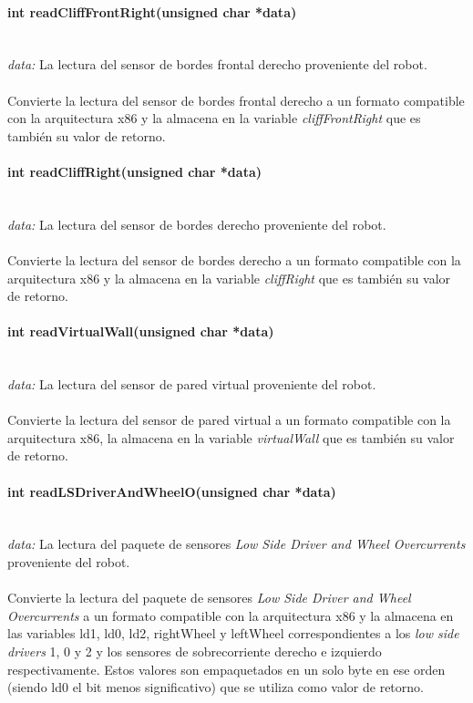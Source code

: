\documentclass[letterpaper,openright,12pt]{book}
\begin{document}
\paragraph{int readCliffFrontRight(unsigned char *data)}\mbox{}\\
\emph{data: }La lectura del sensor de bordes frontal derecho proveniente del robot.\\\\
Convierte la lectura del sensor de bordes frontal derecho a un formato compatible con la arquitectura x86 y la almacena en la variable \emph{cliffFrontRight} que es también su valor de retorno.\\ 

\paragraph{int readCliffRight(unsigned char *data)}\mbox{}\\
\emph{data: }La lectura del sensor de bordes derecho proveniente del robot.\\\\
Convierte la lectura del sensor de bordes derecho a un formato compatible con la arquitectura x86 y la almacena en la variable \emph{cliffRight} que es también su valor de retorno.\\ 

\paragraph{int readVirtualWall(unsigned char *data)}\mbox{}\\
\emph{data: }La lectura del sensor de pared virtual proveniente del robot.\\\\
Convierte la lectura del sensor de pared virtual a un formato compatible con la arquitectura x86, la almacena en la variable \emph{virtualWall} que es también su valor de retorno.\\ 

\paragraph{int readLSDriverAndWheelO(unsigned char *data)}\mbox{}\\
\emph{data: }La lectura del paquete de sensores \emph{Low Side Driver and Wheel Overcurrents} proveniente del robot.\\\\
Convierte la lectura del paquete de sensores \emph{Low Side Driver and Wheel Overcurrents} a un formato compatible con la arquitectura x86 y la almacena en las variables ld1, ld0, ld2, rightWheel y	leftWheel correspondientes a los \emph{low side drivers} 1, 0 y 2 y los sensores de sobrecorriente derecho e izquierdo respectivamente. Estos valores son empaquetados en un solo byte en ese orden (siendo ld0 el bit menos significativo) que se utiliza como valor de retorno.\\
\end{document}

